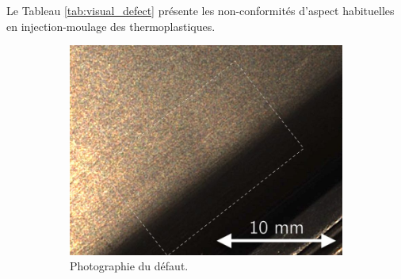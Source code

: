 Le Tableau \ref{tab:visual_defect} présente les non-conformités d'aspect habituelles en injection-moulage des thermoplastiques.

\bigskip

\begin{figure}[tbhp!]
	\centering
	\begin{subfigure}[c]{0.48\textwidth}
		\centering
		\vspace{4\baselineskip}
		\includegraphics[width=\textwidth]{../Chap2/Figures/Cam1_Image_22_PO_defect_AVEC.jpg}
		\caption{Photographie du défaut.}
	\end{subfigure}
	\begin{subfigure}[c]{0.48\textwidth}
		\centering

\end{subfigure}
\end{figure}
